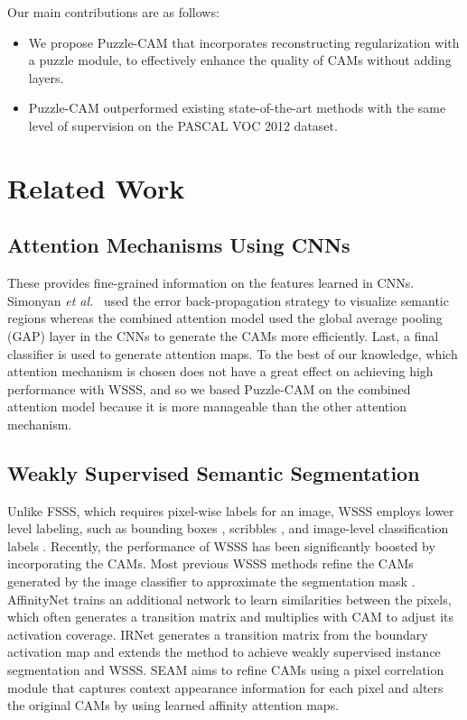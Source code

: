 \documentclass{article}
\begin{document}
Our main contributions are as follows:
\begin{itemize}
  \item We propose Puzzle-CAM that incorporates reconstructing regularization with a puzzle module, to effectively enhance the quality of CAMs without adding layers.
  \item Puzzle-CAM outperformed existing state-of-the-art methods with the same level of supervision on the PASCAL VOC 2012 dataset. 
\end{itemize}

\section{Related Work}
\label{sec:related}



\subsection{Attention Mechanisms Using CNNs}
\label{ssec:attention}
These provides fine-grained information on the features learned in CNNs.
Simonyan \textit{et al.}~\cite{simonyan2013deep} used the error back-propagation strategy to visualize semantic regions whereas the combined attention model used the global average pooling (GAP) layer in the CNNs to generate the CAMs \cite{zhou2016learning} more efficiently.
Last, a final classifier is used to generate attention maps.
To the best of our knowledge, which attention mechanism is chosen does not have a great effect on achieving high performance with WSSS, and so we based Puzzle-CAM on the combined attention model because it is more manageable than the other attention mechanism.

\subsection{Weakly Supervised Semantic Segmentation}
\label{ssec:wsss}
Unlike FSSS, which requires pixel-wise labels for an image, WSSS employs lower level labeling, such as bounding boxes \cite{khoreva2017simple}, scribbles \cite{lin2016scribblesup}, and image-level classification labels \cite{ahn2018learning, lee2019ficklenet}.
Recently, the performance of WSSS has been significantly boosted by incorporating the CAMs.
Most previous WSSS methods refine the CAMs generated by the image classifier to approximate the segmentation mask \cite{ahn2018learning, ahn2019weakly, huang2018weakly, hou2018self, lee2019ficklenet}.
AffinityNet \cite{ahn2018learning} trains an additional network to learn similarities between the pixels, which often generates a transition matrix and multiplies with CAM to adjust its activation coverage. 
IRNet \cite{ahn2019weakly} generates a transition matrix from the boundary activation map and extends the method to achieve weakly supervised instance segmentation and WSSS. 
SEAM \cite{Wang_2020_CVPR} aims to refine CAMs using a pixel correlation module that captures context appearance information for each pixel and alters the original CAMs by using learned affinity attention maps.
\end{document}
